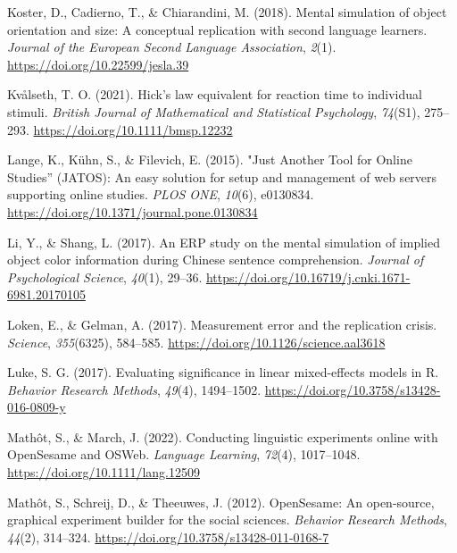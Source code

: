 \documentclass[
  man,floatsintext]{apa7}
\newlength{\cslhangindent}
\newlength{\cslentryspacingunit} %
\newenvironment{CSLReferences}[2] %
 {%
  \setlength{\parindent}{0pt}
  \ifodd #1
  \let\oldpar\par
  \def\par{\hangindent=\cslhangindent\oldpar}
  \fi
  \setlength{\parskip}{#2\cslentryspacingunit}
 }%
 {}
\begin{document}
\begin{CSLReferences}{1}{0}
\leavevmode{}%
Koster, D., Cadierno, T., \& Chiarandini, M. (2018). Mental simulation of object orientation and size: {A} conceptual replication with second language learners. \emph{Journal of the European Second Language Association}, \emph{2}(1). \url{https://doi.org/10.22599/jesla.39}

\leavevmode{}%
Kvålseth, T. O. (2021). Hick's law equivalent for reaction time to individual stimuli. \emph{British Journal of Mathematical and Statistical Psychology}, \emph{74}(S1), 275--293. \url{https://doi.org/10.1111/bmsp.12232}

\leavevmode{}%
Lange, K., Kühn, S., \& Filevich, E. (2015). "{Just Another Tool} for {Online Studies}'' ({JATOS}): {An} easy solution for setup and management of web servers supporting online studies. \emph{PLOS ONE}, \emph{10}(6), e0130834. \url{https://doi.org/10.1371/journal.pone.0130834}

\leavevmode{}%
Li, Y., \& Shang, L. (2017). {An ERP study on the mental simulation of implied object color information during Chinese sentence comprehension}. \emph{Journal of Psychological Science}, \emph{40}(1), 29--36. \url{https://doi.org/10.16719/j.cnki.1671-6981.20170105}

\leavevmode{}%
Loken, E., \& Gelman, A. (2017). Measurement error and the replication crisis. \emph{Science}, \emph{355}(6325), 584--585. \url{https://doi.org/10.1126/science.aal3618}

\leavevmode{}%
Luke, S. G. (2017). Evaluating significance in linear mixed-effects models in {R}. \emph{Behavior Research Methods}, \emph{49}(4), 1494--1502. \url{https://doi.org/10.3758/s13428-016-0809-y}

\leavevmode{}%
Mathôt, S., \& March, J. (2022). Conducting {linguistic} {experiments} {online} {with} {OpenSesame} and {OSWeb}. \emph{Language Learning}, \emph{72}(4), 1017--1048. \url{https://doi.org/10.1111/lang.12509}

\leavevmode{}%
Mathôt, S., Schreij, D., \& Theeuwes, J. (2012). {OpenSesame}: {An} open-source, graphical experiment builder for the social sciences. \emph{Behavior Research Methods}, \emph{44}(2), 314--324. \url{https://doi.org/10.3758/s13428-011-0168-7}


\end{CSLReferences}
\end{document}
